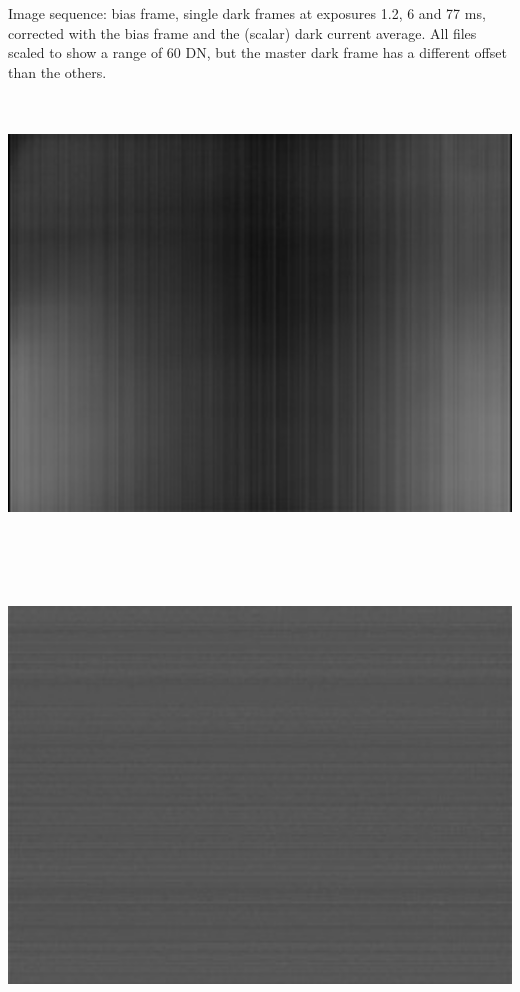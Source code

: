     
Image sequence: bias frame, single dark frames at exposures 1.2, 6 and 77 ms, corrected with the bias frame and the (scalar) dark current average. All files scaled to show a range of 60 DN, but the master dark frame has a different offset than the others.     


\begin{center}
\includegraphics[height=12cm]{images/darkframe-x1-no-blackcol-256}
\end{center}

\begin{center}
\includegraphics[height=12cm]{images/blackframes-gainx1-offset2047-1ms-01-simple-darkframe-no-blackcol}
\end{center} 

